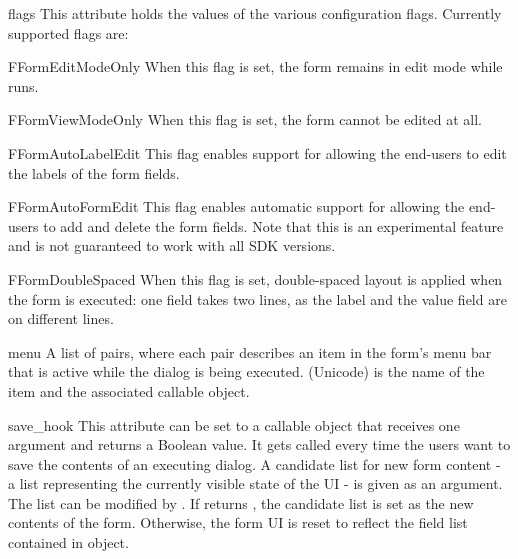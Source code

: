 \begin{memberdesc}[Form]{flags}
This attribute holds the values of the various configuration flags. 
Currently supported flags are:

\begin{datadesc}{FFormEditModeOnly}
When this flag is set, the form remains in edit mode while  
runs.
\end{datadesc}

\begin{datadesc}{FFormViewModeOnly}
When this flag is set, the form cannot be edited at all.
\end{datadesc}

\begin{datadesc}{FFormAutoLabelEdit}
This flag enables support for allowing the end-users to edit the labels of 
the form fields.
\end{datadesc}

\begin{datadesc}{FFormAutoFormEdit}
This flag enables automatic support for allowing the end-users to add and 
delete the form fields. Note that this is an experimental feature and is not 
guaranteed to work with all SDK versions.
\end{datadesc}

\begin{datadesc}{FFormDoubleSpaced}
When this flag is set, double-spaced layout is applied when the form is 
executed: one field takes two lines, as the label and the value field are on 
different lines.
\end{datadesc}
\end{memberdesc}

\begin{memberdesc}[Form]{menu}
A list of  pairs, where 
each pair describes an item in the form's menu bar that is active while the 
dialog is being executed.  (Unicode) is the name of 
the item and  the associated callable object.
\end{memberdesc}

\begin{memberdesc}[Form]{save_hook}
This attribute can be set to a callable object that receives one argument 
and returns a Boolean value. It gets called every time the users want to 
save the contents of an executing  dialog. A candidate list for 
new form content - a list representing the currently visible state of the 
UI - is given as an argument. The list can be modified by 
. If  returns , the 
candidate list is set as the new contents of the form. Otherwise, the form 
UI is reset to reflect the field list contained in  object.
\end{memberdesc}

